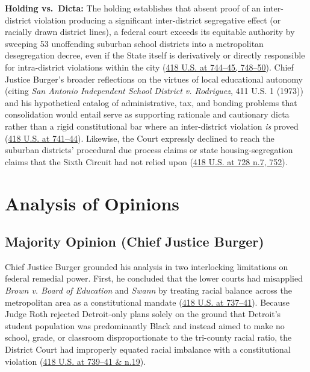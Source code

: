 \documentclass[12pt]{article}
\begin{document}
\textbf{Holding vs.\ Dicta:} The holding establishes that absent proof of an inter-district violation producing a significant inter-district segregative effect (or racially drawn district lines), a federal court exceeds its equitable authority by sweeping 53 unoffending suburban school districts into a metropolitan desegregation decree, even if the State itself is derivatively or directly responsible for intra-district violations within the city (\href{https://supreme.justia.com/cases/federal/us/418/717/}{418 U.S. at 744--45, 748--50}). Chief Justice Burger's broader reflections on the virtues of local educational autonomy (citing \textit{San Antonio Independent School District v. Rodriguez}, 411 U.S. 1 (1973)) and his hypothetical catalog of administrative, tax, and bonding problems that consolidation would entail serve as supporting rationale and cautionary dicta rather than a rigid constitutional bar where an inter-district violation \textit{is} proved (\href{https://supreme.justia.com/cases/federal/us/418/717/}{418 U.S. at 741--44}). Likewise, the Court expressly declined to reach the suburban districts' procedural due process claims or state housing-segregation claims that the Sixth Circuit had not relied upon (\href{https://supreme.justia.com/cases/federal/us/418/717/}{418 U.S. at 728 n.7, 752}).

\section{Analysis of Opinions}

\subsection{Majority Opinion (Chief Justice Burger)}
Chief Justice Burger grounded his analysis in two interlocking limitations on federal remedial power. First, he concluded that the lower courts had misapplied \textit{Brown v. Board of Education} and \textit{Swann} by treating racial balance across the metropolitan area as a constitutional mandate (\href{https://supreme.justia.com/cases/federal/us/418/717/}{418 U.S. at 737--41}). Because Judge Roth rejected Detroit-only plans solely on the ground that Detroit's student population was predominantly Black and instead aimed to make no school, grade, or classroom disproportionate to the tri-county racial ratio, the District Court had improperly equated racial imbalance with a constitutional violation (\href{https://supreme.justia.com/cases/federal/us/418/717/}{418 U.S. at 739--41 \& n.19}).
\end{document}
